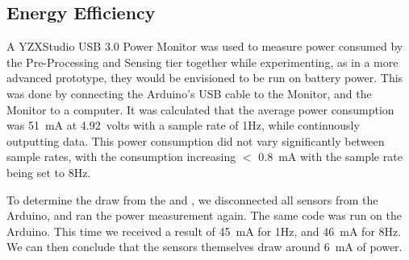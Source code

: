 \documentclass[../thesis/thesis.tex]{subfiles}
\begin{document}
\subsection{Energy Efficiency}
\label{subsec:energy}


A YZXStudio USB 3.0 Power Monitor was used to measure power consumed by the Pre-Processing and Sensing tier together while experimenting, as in a more advanced prototype, they would be envisioned to be run on battery power. This was done by connecting the Arduino's USB cable to the Monitor, and the Monitor to a computer. It was calculated that the average power consumption was 51~mA at 4.92~volts with a sample rate of 1Hz, while continuously outputting data. This power consumption did not vary significantly between sample rates, with the consumption increasing $<$ 0.8~mA with the sample rate being set to 8Hz.

To determine the draw from the \pir and \iar, we disconnected all sensors from the Arduino, and ran the power measurement again. The same code was run on the Arduino. This time we received a result of 45~mA for 1Hz, and 46~mA for 8Hz. We can then conclude that the sensors themselves draw around 6~mA of power.


\end{document}

